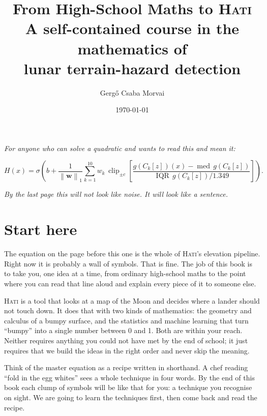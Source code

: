 \documentclass[11pt,oneside]{book}
\title{\sffamily\bfseries\color{ink}\Huge From High-School Maths to \textsc{Hati}\\[6pt]
\LARGE\mdseries A self-contained course in the mathematics of\\ lunar terrain-hazard detection}
\author{\Large Gerg\H{o} Csaba Morvai}
\date{\today}
\newcommand{\norm}[1]{\left\lVert #1\right\rVert}
\begin{document}
\frontmatter
\maketitle

\thispagestyle{empty}
\noindent\begin{center}\itshape
For anyone who can solve a quadratic and wants to read this and mean it:
\end{center}
\begin{equation*}
H(x)=\sigma\!\left(b+\frac{1}{\norm{\mathbf w}_1}\sum_{k=1}^{10} w_k\,
\operatorname{clip}_{\pm c}\!\left[\frac{g(C_k[z])(x)-\operatorname{med}\,g(C_k[z])}{\operatorname{IQR}\,g(C_k[z])/1.349}\right]\right).
\end{equation*}
\begin{center}\itshape
By the last page this will not look like noise. It will look like a sentence.\end{center}

\tableofcontents

\chapter*{Start here}

The equation on the page before this one is the whole of \textsc{Hati}'s elevation
pipeline. Right now it is probably a wall of symbols. That is fine. The job of this
book is to take you, one idea at a time, from ordinary high-school maths to the point
where you can read that line aloud and explain every piece of it to someone else.

\textsc{Hati} is a tool that looks at a map of the Moon and decides where a lander
should not touch down. It does that with two kinds of mathematics: the geometry and
calculus of a bumpy surface, and the statistics and machine learning that turn
``bumpy'' into a single number between 0 and 1. Both are within your reach. Neither
requires anything you could not have met by the end of school; it just requires that
we build the ideas in the right order and never skip the meaning.

\begin{intuition}
Think of the master equation as a recipe written in shorthand. A chef reading
``fold in the egg whites'' sees a whole technique in four words. By the end of this
book each clump of symbols will be like that for you: a technique you recognise on
sight. We are going to learn the techniques first, then come back and read the recipe.
\end{intuition}
\end{document}
